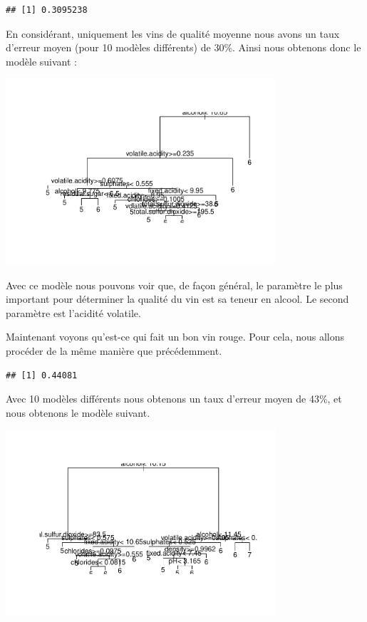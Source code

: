 \documentclass[
]{article}
\begin{document}
\begin{verbatim}
## [1] 0.3095238
\end{verbatim}

En considérant, uniquement les vins de qualité moyenne nous avons un
taux d'erreur moyen (pour 10 modèles différents) de 30\%. Ainsi nous
obtenons donc le modèle suivant :

\begin{center}
	\includegraphics[width=10cm]{repport_files/figure-latex/unnamed-chunk-20-1.pdf}
\end{center} Avec
ce modèle nous pouvons voir que, de façon général, le paramètre le plus
important pour déterminer la qualité du vin est sa teneur en alcool. Le
second paramètre est l'acidité volatile.

Maintenant voyons qu'est-ce qui fait un bon vin rouge. Pour cela, nous
allons procéder de la même manière que précédemment.

\begin{verbatim}
## [1] 0.44081
\end{verbatim}

Avec 10 modèles différents nous obtenons un taux d'erreur moyen de 43\%,
et nous obtenons le modèle suivant.

\begin{center}
	\includegraphics[width=10cm]{repport_files/figure-latex/unnamed-chunk-22-1.pdf}
\end{center}
\end{document}
